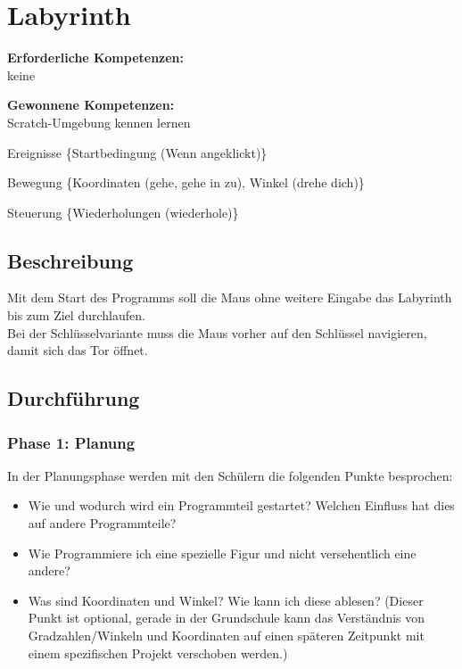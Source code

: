 \section{Labyrinth}\label{labyrinth}

\textbf{Erforderliche Kompetenzen:}\\
keine

\textbf{Gewonnene Kompetenzen:}\\
Scratch-Umgebung kennen lernen

Ereignisse \{Startbedingung (Wenn angeklickt)\}

Bewegung \{Koordinaten (gehe, gehe in zu), Winkel (drehe dich)\}

Steuerung \{Wiederholungen (wiederhole)\}

\begin{figure}[ht]
    \centering 
    \caption[\Sectionname]{\Sectionname}
\end{figure}

\subsection{Beschreibung}\label{beschreibung}

Mit dem Start des Programms soll die Maus ohne weitere Eingabe das
Labyrinth bis zum Ziel durchlaufen.\\
Bei der Schlüsselvariante muss die Maus vorher auf den Schlüssel
navigieren, damit sich das Tor öffnet.

\subsection{Durchführung}\label{durchfuxfchrung}

\subsubsection{Phase 1: Planung}\label{phase-1-planung}

In der Planungsphase werden mit den Schülern die folgenden Punkte
besprochen:

\begin{itemize}
\tightlist
\item
  Wie und wodurch wird ein Programmteil gestartet? Welchen Einfluss hat
  dies auf andere Programmteile?
\item
  Wie Programmiere ich eine spezielle Figur und nicht versehentlich eine
  andere?
\item
  Was sind Koordinaten und Winkel? Wie kann ich diese ablesen? (Dieser
  Punkt ist optional, gerade in der Grundschule kann das Verständnis von
  Gradzahlen/Winkeln und Koordinaten auf einen späteren Zeitpunkt mit
  einem spezifischen Projekt verschoben werden.)
\end{itemize}

